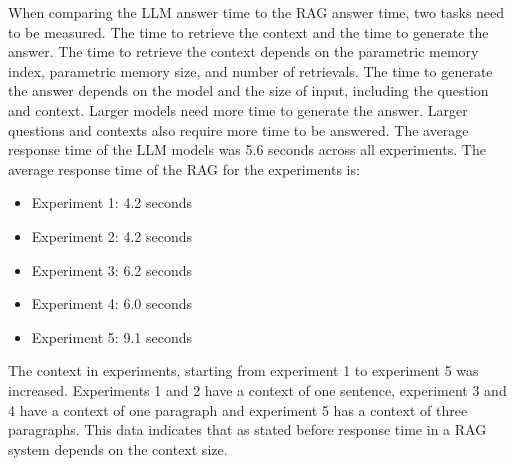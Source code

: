 \documentclass{wseas}
\begin{document}
When comparing the LLM answer time to the RAG answer time, two tasks need to be measured. The time to retrieve the context
and the time to generate the answer. The time to retrieve the context depends on the parametric memory index,
parametric memory size, and number of retrievals. The time to generate the answer depends on the model and the size of input,
including the question and context. Larger models need more time to generate the answer. Larger questions and contexts
also require more time to be answered. The average response time of the LLM models was 5.6 seconds across all experiments.
The average response time of the RAG for the experiments is:
\begin{itemize}
  \item Experiment 1: 4.2 seconds
  \item Experiment 2: 4.2 seconds
  \item Experiment 3: 6.2 seconds
  \item Experiment 4: 6.0 seconds
  \item Experiment 5: 9.1 seconds
\end{itemize}

The context in experiments, starting from experiment 1 to experiment 5 was increased. 
Experiments 1 and 2 have a context of one sentence, experiment 3 and 4 have a context
of one paragraph and experiment 5 has a context of three paragraphs.
This data indicates that as stated before response time in a RAG system depends on the context size.
\end{document}
